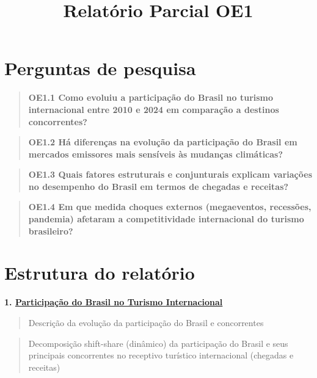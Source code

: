 \documentclass[
  portuguese,
  letterpaper,
  DIV=11,
  numbers=noendperiod]{scrartcl}
\title{Relatório Parcial OE1}
\author{}
\date{}
\renewcommand*\contentsname{Índice}
\newcommand\contentsname{Índice}
\begin{document}
\maketitle

\renewcommand*\contentsname{Sumário}
{
\hypersetup{linkcolor=}
\setcounter{tocdepth}{5}
\tableofcontents
}

\section{Perguntas de pesquisa}\label{perguntas-de-pesquisa}

\begin{quote}
\textbf{OE1.1 Como evoluiu a participação do Brasil no turismo
internacional entre 2010 e 2024 em comparação a destinos concorrentes?}
\end{quote}

\begin{quote}
\textbf{OE1.2 Há diferenças na evolução da participação do Brasil em
mercados emissores mais sensíveis às mudanças climáticas?}
\end{quote}

\begin{quote}
\textbf{OE1.3 Quais fatores estruturais e conjunturais explicam
variações no desempenho do Brasil em termos de chegadas e receitas?}
\end{quote}

\begin{quote}
\textbf{OE1.4 Em que medida choques externos (megaeventos, recessões,
pandemia) afetaram a competitividade internacional do turismo
brasileiro?}
\end{quote}

\section{Estrutura do relatório}\label{estrutura-do-relatuxf3rio}

\textbf{1.
\hyperref[participauxe7uxe3o-do-brasil-no-turismo-internacional]{Participação
do Brasil no Turismo Internacional}}

\begin{quote}
Descrição da evolução da participação do Brasil e concorrentes
\end{quote}

\begin{quote}
Decomposição shift-share (dinâmico) da participação do Brasil e seus
principais concorrentes no receptivo turístico internacional (chegadas e
receitas)
\end{quote}
\end{document}
